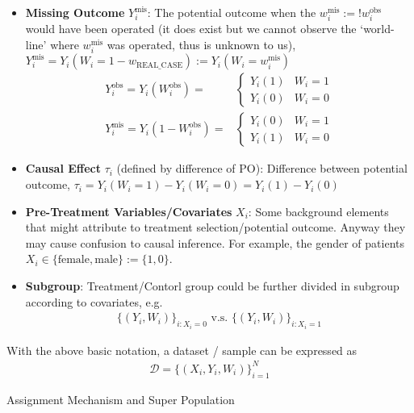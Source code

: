 \begin{itemize}[topsep=2pt,itemsep=0pt]
        \item \textbf{Missing Outcome} $ Y_i^{\mathrm{mis} } $: The potential outcome when the $ w_i^\mathrm{mis}:= !w_i^\mathrm{obs}  $ would have been operated (it does exist but we cannot observe the `world-line' where $ w^{\mathrm{mis} }_i $ was operated, thus is unknown to us), $ Y_i^{\mathrm{mis} }=Y_i(W_i=1-w_\mathrm{REAL\_CASE}):=Y_i(W_i=w_i^{\mathrm{mis} }) $ 
        \begin{align}
            Y^\mathrm{obs} _i=Y_i(W_i^\mathrm{obs} )=&\begin{cases}
                Y_i(1)&W_i=1\\
                Y_i(0)&W_i=0
            \end{cases}\\
            Y^{\mathrm{mis} }_i=Y_i(1-W_i^\mathrm{obs} )=&\begin{cases}
                Y_i(0)&W_i=1\\
                Y_i(1)&W_i=0
            \end{cases}
        \end{align}
        \item \textbf{Causal Effect} $ \tau_i $ (defined by difference of PO): Difference between potential outcome, $ \tau_i=Y_i(W_i=1)-Y_i(W_i=0)=Y_i(1)-Y_i(0) $
        \item \textbf{Pre-Treatment Variables/Covariates} $ X_i $: Some background elements that might attribute to treatment selection/potential outcome. Anyway they may cause confusion to causal inference. For example, the gender of patients $ X_i\in\{\mathrm{female}, \mathrm{male}  \}:=\{1,0\} $.
        \item \textbf{Subgroup}: Treatment/Contorl group could be further divided in subgroup according to covariates, e.g.
        \begin{align}
            \{(Y_i,W_i)\}_{i:X_i=0}\text{ v.s. }  \{(Y_i,W_i)\}_{i:X_i=1}
        \end{align}
    \end{itemize}

    With the above basic notation, a dataset / sample can be expressed as
    \begin{align}
        \mathcal{D}=\{(X_i,Y_i,W_i)\}_{i=1}^N 
    \end{align}
    

\begin{point}
    Assignment Mechanism and Super Population
\end{point}

